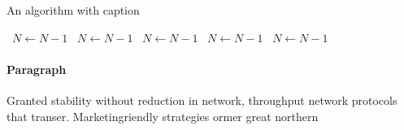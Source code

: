 \documentclass[a4paper]{article}
\begin{document}
\begin{algorithm}
\caption{An algorithm with caption}
\begin{algorithmic}
\    \State $N \gets N - 1$
\    \State $N \gets N - 1$
\    \State $N \gets N - 1$
\    \State $N \gets N - 1$
\    \State $N \gets N - 1$
\EndWhile
\end{algorithmic}
\end{algorithm}

\paragraph{Paragraph}
Granted stability without reduction in network, throughput network protocols that transer. Marketingriendly strategies ormer great northern
\end{document}
